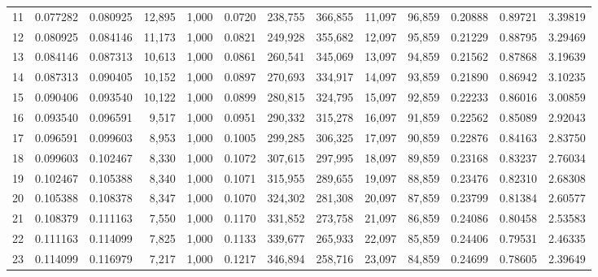 \begin{tabular}{rrrrrrrrrrrrr}
11  &  0.077282 &  0.080925 &  12,895 &  1,000 &                                     0.0720 &  238,755 &  366,855 &   11,097 &   96,859 &  0.20888 &  0.89721 &  3.39819 \\
12  &  0.080925 &  0.084146 &  11,173 &  1,000 &                                     0.0821 &  249,928 &  355,682 &   12,097 &   95,859 &  0.21229 &  0.88795 &  3.29469 \\
13  &  0.084146 &  0.087313 &  10,613 &  1,000 &                                     0.0861 &  260,541 &  345,069 &   13,097 &   94,859 &  0.21562 &  0.87868 &  3.19639 \\
14  &  0.087313 &  0.090405 &  10,152 &  1,000 &                                     0.0897 &  270,693 &  334,917 &   14,097 &   93,859 &  0.21890 &  0.86942 &  3.10235 \\
15  &  0.090406 &  0.093540 &  10,122 &  1,000 &                                     0.0899 &  280,815 &  324,795 &   15,097 &   92,859 &  0.22233 &  0.86016 &  3.00859 \\
16  &  0.093540 &  0.096591 &   9,517 &  1,000 &                                     0.0951 &  290,332 &  315,278 &   16,097 &   91,859 &  0.22562 &  0.85089 &  2.92043 \\
17  &  0.096591 &  0.099603 &   8,953 &  1,000 &                                     0.1005 &  299,285 &  306,325 &   17,097 &   90,859 &  0.22876 &  0.84163 &  2.83750 \\
18  &  0.099603 &  0.102467 &   8,330 &  1,000 &                                     0.1072 &  307,615 &  297,995 &   18,097 &   89,859 &  0.23168 &  0.83237 &  2.76034 \\
19  &  0.102467 &  0.105388 &   8,340 &  1,000 &                                     0.1071 &  315,955 &  289,655 &   19,097 &   88,859 &  0.23476 &  0.82310 &  2.68308 \\
20  &  0.105388 &  0.108378 &   8,347 &  1,000 &                                     0.1070 &  324,302 &  281,308 &   20,097 &   87,859 &  0.23799 &  0.81384 &  2.60577 \\
21  &  0.108379 &  0.111163 &   7,550 &  1,000 &                                     0.1170 &  331,852 &  273,758 &   21,097 &   86,859 &  0.24086 &  0.80458 &  2.53583 \\
22  &  0.111163 &  0.114099 &   7,825 &  1,000 &                                     0.1133 &  339,677 &  265,933 &   22,097 &   85,859 &  0.24406 &  0.79531 &  2.46335 \\
23  &  0.114099 &  0.116979 &   7,217 &  1,000 &                                     0.1217 &  346,894 &  258,716 &   23,097 &   84,859 &  0.24699 &  0.78605 &  2.39649 \\

\end{tabular}
